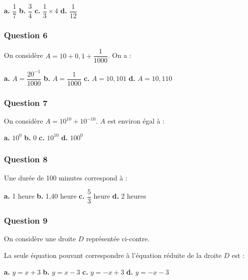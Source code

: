 \textbf{a.} $\dfrac{1}{7}$ \hfill \textbf{b.} $\dfrac{3}{4}$ \hfill \textbf{c.} $\dfrac{1}{3} \times 4$ \hfill \textbf{d.} $\dfrac{1}{12}$

\subsubsection*{Question 6}
On considère $A = 10 + 0,1 + \dfrac{1}{1000}$. On a :

\textbf{a.} $A = \dfrac{20^{- 1}}{1000}$ \hfill \textbf{b.} $A = \dfrac{1}{1000}$ \hfill 
\textbf{c.} $A = 10,101$ \hfill \textbf{d.} $A = 10,110$

\subsubsection*{Question 7}
On considère $A = 10^{10} + 10^{-10}$. $A$ est environ égal à :

\textbf{a.} $10^0$ \hfill \textbf{b.} $0$ \hfill \textbf{c.} $10^{10}$ \hfill \textbf{d.} $100^0$

\subsubsection*{Question 8}
Une durée de 100 minutes correspond à :

\textbf{a.} 1 heure \hfill \textbf{b.} 1,40 heure \hfill 
\textbf{c.} $\dfrac{5}{3}$ heure \hfill \textbf{d.} 2 heures

\bigskip

\begin{minipage}[t]{0.7\textwidth}
\subsubsection*{Question 9}
On considère une droite $D$ représentée ci-contre.

La seule équation pouvant correspondre à l'équation réduite de la droite $D$ est :

\textbf{a.} $y = x + 3$ \hfill \textbf{b.} $y = x - 3$ \hfill 
\textbf{c.} $y = -x + 3$ \hfill \textbf{d.} $y = -x - 3$
\end{minipage}
\hfill
\begin{minipage}[t]{0.29\textwidth}
\vspace{0pt}
\begin{center}
\end{center}
\end{minipage}

